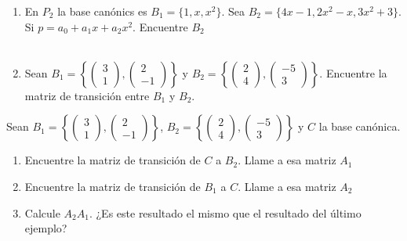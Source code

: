 \begin{ejem}
\begin{enumerate}
\item
En $P_2$ la base canónics es $B_1 = \{ 1,x,x^2 \}$. Sea $B_2 = \{ 4x-1,2x^2-x,3x^2+3 \}$. Si $p = a_0 + a_1x + a_2x^2$. Encuentre $B_2$
\\\

\item
Sean $B_1 = \left\{ \begin{pmatrix} 3 \\ 1 \end{pmatrix} ,\begin{pmatrix} 2 \\ -1  \end{pmatrix} \right\}$ y $B_2 = \left\{ \begin{pmatrix} 2 \\ 4 \end{pmatrix} ,\begin{pmatrix} -5 \\ 3 \end{pmatrix} \right\}$. Encuentre la matriz de transición entre $B_1$ y $B_2$.
\end{enumerate}
\end{ejem}





\begin{ejem}
Sean $B_1 = \left\{ \begin{pmatrix} 3 \\ 1 \end{pmatrix} ,\begin{pmatrix} 2 \\ -1  \end{pmatrix} \right\}$, $B_2 = \left\{ \begin{pmatrix} 2 \\ 4 \end{pmatrix} ,\begin{pmatrix} -5 \\ 3 \end{pmatrix} \right\}$ y $C$ la base canónica. 

\begin{enumerate}
\item
Encuentre la matriz de transición de $C$ a $B_2$. Llame a esa matriz $A_1$

\item
Encuentre la matriz de transición de $B_1$ a $C$. Llame a esa matriz $A_2$

\item
Calcule $A_2A_1$. ¿Es este resultado el mismo que el resultado del último ejemplo?
\end{enumerate}
\end{ejem}





